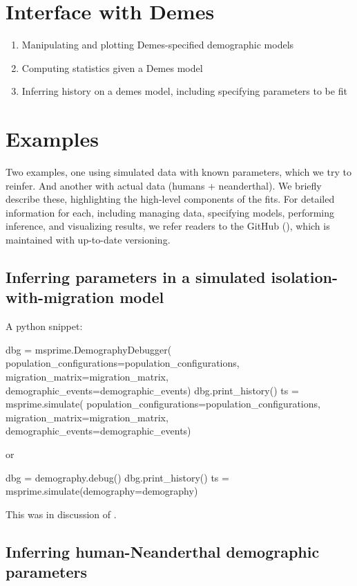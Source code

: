\documentclass[]{article}
\begin{document}
\section{Interface with Demes}

\begin{enumerate}
    \item Manipulating and plotting Demes-specified demographic models
    \item Computing statistics given a Demes model
    \item Inferring history on a demes model, including specifying parameters to be fit
\end{enumerate}

\section{Examples}

Two examples, one using simulated data with known parameters, which we try to
reinfer. And another with actual data (humans + neanderthal). We briefly
describe these, highlighting the high-level components of the fits. For
detailed information for each, including managing data, specifying models,
performing inference, and visualizing results, we refer readers to the GitHub
(\url{}), which is maintained with up-to-date versioning.

\subsection{Inferring parameters in a simulated isolation-with-migration model}

A python snippet:
\begin{python}
dbg = msprime.DemographyDebugger(
  population_configurations=population_configurations,
  migration_matrix=migration_matrix,
  demographic_events=demographic_events)
dbg.print_history()
ts = msprime.simulate(
  population_configurations=population_configurations,
  migration_matrix=migration_matrix,
  demographic_events=demographic_events)
\end{python}
or
\begin{python}
dbg = demography.debug()
dbg.print_history()
ts = msprime.simulate(demography=demography)
\end{python}

This was in discussion of \citet{kelleher2016efficient}.

\subsection{Inferring human-Neanderthal demographic parameters}
\end{document}
